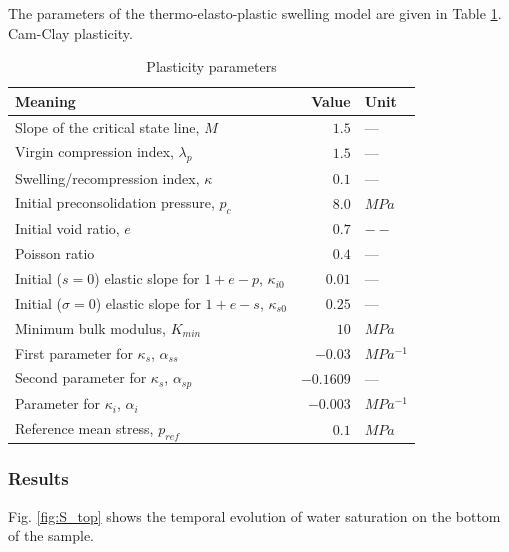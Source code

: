 The parameters of the thermo-elasto-plastic swelling model are given in Table \ref{tab:pls}.
Cam-Clay plasticity.

\begin{table}[!htb]
\centering
\begin{tabular}{lrl}
\hline\noalign{\smallskip}
\hline
Meaning & Value & Unit \\
\hline
Slope of the critical state line, $M$ & $1.5$ & ---\\
Virgin compression index, $\lambda_p$ & $1.5$ & ---\\
Swelling/recompression index, $\kappa$ & $0.1$ & ---\\
Initial preconsolidation pressure, $p_c$& $8.0$ & $MPa$\\
Initial void ratio, $e$ & $0.7$ & $--$\\
\hline
Poisson ratio & $0.4$ & ---\\
Initial ($s=0$) elastic slope for $1+e-p$, $\kappa_{i0}$& $0.01$ & ---\\
Initial ($\sigma=0$) elastic slope for $1+e-s$, $\kappa_{s0}$& $0.25$ & ---\\
Minimum bulk modulus, $K_{min}$ & $10$ &$MPa$\\
First parameter for $\kappa_s$, $\alpha_{ss}$ & $-0.03$ & $MPa^{-1}$\\
Second parameter for $\kappa_s$, $\alpha_{sp}$ & $-0.1609$ & ---\\
Parameter for $\kappa_i$, $\alpha_{i}$ & $-0.003$ & $MPa^{-1}$\\
Reference mean stress, $p_{ref}$ & $0.1$ & $MPa$\\
\hline\hline
\end{tabular}
\caption{Plasticity parameters} %
\label{tab:pls}
\end{table}


\subsubsection{Results}

Fig. \ref{fig:S_top} shows the temporal evolution of water saturation on the bottom of the sample.

